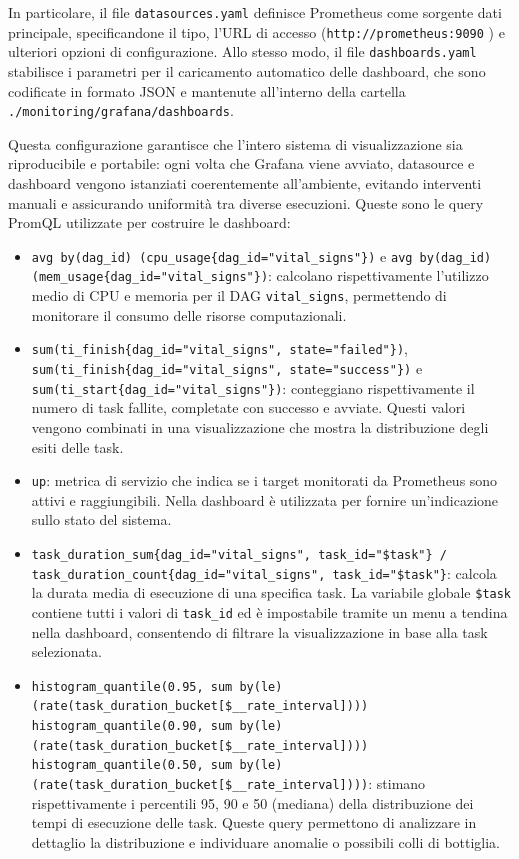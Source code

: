 In particolare, il file \texttt{datasources.yaml} definisce Prometheus come sorgente dati principale, specificandone il tipo, l’URL di accesso (\texttt{http://prometheus:9090}
) e ulteriori opzioni di configurazione. Allo stesso modo, il file \texttt{dashboards.yaml} stabilisce i parametri per il caricamento automatico delle dashboard, che sono codificate in formato JSON e mantenute all’interno della cartella \texttt{./monitoring/grafana/dashboards}.

Questa configurazione garantisce che l’intero sistema di visualizzazione sia riproducibile e portabile: ogni volta che Grafana viene avviato, datasource e dashboard vengono istanziati coerentemente all’ambiente, evitando interventi manuali e assicurando uniformità tra diverse esecuzioni.
Queste sono le query PromQL utilizzate per costruire le dashboard:

\begin{itemize}
    \item \texttt{avg by(dag\_id) (cpu\_usage\{dag\_id="vital\_signs"\})} e \texttt{avg by(dag\_id) (mem\_usage\{dag\_id="vital\_signs"\})}: calcolano rispettivamente l’utilizzo medio di CPU e memoria per il DAG \texttt{vital\_signs}, permettendo di monitorare il consumo delle risorse computazionali.
    
    \item \texttt{sum(ti\_finish\{dag\_id="vital\_signs", state="failed"\})}, \texttt{sum(ti\_finish\{dag\_id="vital\_signs", state="success"\})} e \texttt{sum(ti\_start\{dag\_id="vital\_signs"\})}: conteggiano rispettivamente il numero di task fallite, completate con successo e avviate. Questi valori vengono combinati in una visualizzazione che mostra la distribuzione degli esiti delle task.
    
    \item \texttt{up}: metrica di servizio che indica se i target monitorati da Prometheus sono attivi e raggiungibili. Nella dashboard è utilizzata per fornire un’indicazione sullo stato del sistema.
    
    \item \texttt{task\_duration\_sum\{dag\_id="vital\_signs", task\_id="\$task"\} / task\_duration\_count\{dag\_id="vital\_signs", task\_id="\$task"\}}: calcola la durata media di esecuzione di una specifica task. La variabile globale \texttt{\$task} contiene tutti i valori di \texttt{task\_id} ed è impostabile tramite un menu a tendina nella dashboard, consentendo di filtrare la visualizzazione in base alla task selezionata.
    
    \item \texttt{histogram\_quantile(0.95, sum by(le)(rate(task\_duration\_bucket[\$\_\_rate\_interval])))}  
    \texttt{histogram\_quantile(0.90, sum by(le)(rate(task\_duration\_bucket[\$\_\_rate\_interval])))}  
    \texttt{histogram\_quantile(0.50, sum by(le)(rate(task\_duration\_bucket[\$\_\_rate\_interval])))}: stimano rispettivamente i percentili 95, 90 e 50 (mediana) della distribuzione dei tempi di esecuzione delle task. Queste query permettono di analizzare in dettaglio la distribuzione e individuare anomalie o possibili colli di bottiglia.
\end{itemize}

